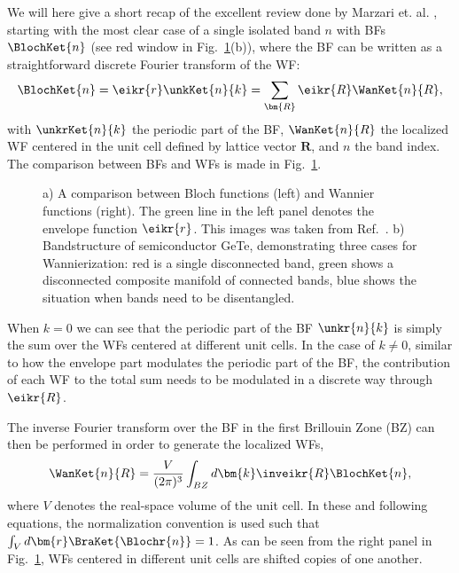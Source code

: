 We will here give a short recap of the excellent review done by Marzari et. al. \cite{Marzari2012}, starting with the most clear case of a single isolated band $n$ with BFs $\BlochKet{n}$ (see red window in Fig.~\ref{fig:Theory_blochvswan}(b)), where the BF can be written as a straightforward discrete Fourier transform of the WF: 
\begin{equation}
	\label{eq:Theory_1bandwan}
	\BlochKet{n} = \eikr{r} \unkKet{n}{k} = \sum_{\bm{R}} \eikr{R} \WanKet{n}{R},
\end{equation}
with $\unkrKet{n}{k}$ the periodic part of the BF, $\WanKet{n}{R}$ the localized WF centered in the unit cell defined by lattice vector $\bm{R}$, and $n$ the band index.
The comparison between BFs and WFs is made in Fig.~\ref{fig:Theory_blochvswan}.
\begin{figure}
	\begin{subfigure}{0.49\textwidth}
		\caption{}
	\end{subfigure}
	\begin{subfigure}{0.49\textwidth}
		\caption{}
	\end{subfigure}
	\caption{\label{fig:Theory_blochvswan} a) A comparison between Bloch functions (left) and Wannier functions (right). The green line in the left panel denotes the envelope function $\eikr{r}$. This images was taken from Ref.~\cite{Marzari2012}. b) Bandstructure of semiconductor GeTe, demonstrating three cases for Wannierization: red is a single disconnected band, green shows a disconnected composite manifold of connected bands, blue shows the situation when bands need to be disentangled.}
\end{figure}
When $k=0$ we can see that the periodic part of the BF $\unkr{n}{k}$ is simply the sum over the WFs centered at different unit cells.
In the case of $k \neq 0$, similar to how the envelope part modulates the periodic part of the BF, the contribution of each WF to the total sum needs to be modulated in a discrete way through $\eikr{R}$.

The inverse Fourier transform over the BF in the first Brillouin Zone (BZ) can then be performed in order to generate the localized WFs,
\begin{equation}
	\label{eq:Theory_wanfourier}
	\WanKet{n}{R} = \frac{V}{(2\pi)^3} \int_{BZ} d \bm{k} \inveikr{R} \BlochKet{n},
\end{equation}
where $V$ denotes the real-space volume of the unit cell.
In these and following equations, the normalization convention is used such that $\int_V d\bm{r}\BraKet{\Blochr{n}} = 1$.
As can be seen from the right panel in Fig.~\ref{fig:Theory_blochvswan}, WFs centered in different unit cells are shifted copies of one another.

